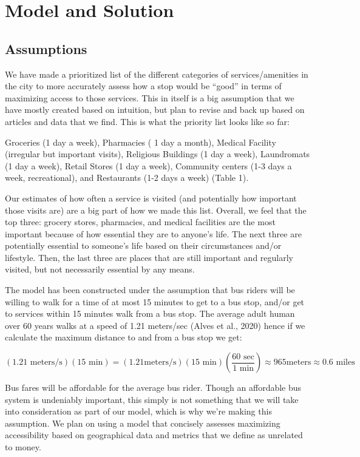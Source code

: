 \section{Model and Solution}


\subsection{Assumptions}

    We have made a prioritized list of the different categories of services/amenities in the city to more accurately assess how a stop would be “good” in terms of maximizing access to those services. This in itself is a big assumption that we have mostly created based on intuition, but plan to revise and back up based on articles and data that we find. This is what the priority list looks like so far:


Groceries (1 day a week),
Pharmacies ( 1 day a month),
Medical Facility (irregular but important visits),
Religious Buildings (1 day a week),
Laundromats (1 day a week),
Retail Stores (1 day a week),
Community centers (1-3 days a week, recreational), and
Restaurants (1-2 days a week) (Table 1).



Our estimates of how often a service is visited (and potentially how important those visits are) are a big part of how we made this list. Overall, we feel that the top three:  grocery stores, pharmacies, and medical facilities are  the most important because of how essential they are to anyone’s life. The next three are potentially essential to someone’s life based on their circumstances and/or lifestyle. Then, the last three are places that are still important and regularly visited, but not necessarily essential by any means.

The model has been constructed under the assumption that bus riders will be willing to walk for a time of at most 15 minutes to get to a bus stop, and/or get to services within 15 minutes walk from a bus stop.  The average adult human over 60 years walks at a speed of 1.21 meters/sec (Alves et al., 2020) hence if we calculate the maximum distance to and from a bus stop we get:

\[(1.21\text{ meters/s})(15 \text{ min})=(1.21\text{meters/s})(15\text{ min})\left(\frac{60 \text{ sec}}{1 \text{ min}}\right)\approx 965 \text{meters}\approx 0.6 \text{ miles}\]

Bus fares will be affordable for the average bus rider. Though an affordable bus system is undeniably important, this simply is not something that we will take into consideration as part of our model, which is why we’re making this assumption. We plan on using a model that concisely assesses maximizing accessibility based on geographical data and metrics that we define as unrelated to money. 




